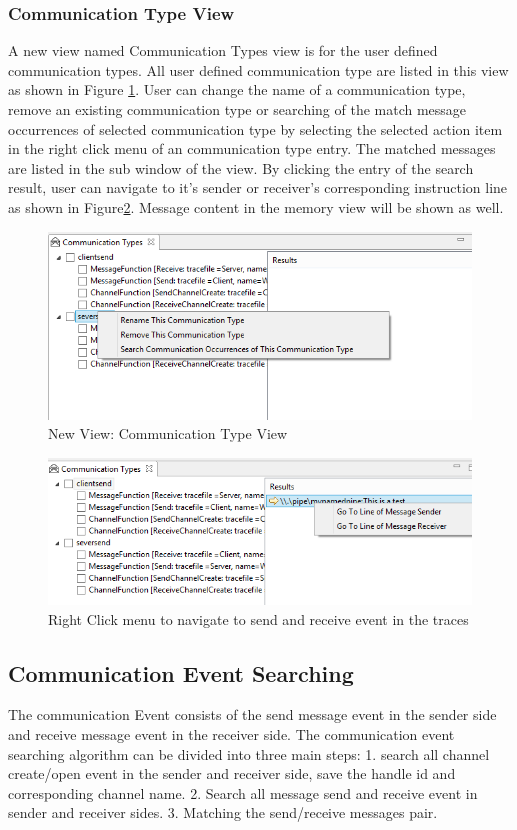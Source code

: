 \documentclass[paper=a4, fontsize=11pt]{scrartcl}
\numberwithin{equation}{section}		%
\numberwithin{figure}{section}			%
\numberwithin{table}{section}				%
\begin{document}
\subsubsection{Communication Type View}
A new view named Communication Types view is for the user defined communication types. All user defined communication type are listed in this view  as shown in Figure \ref{CommunicationTypeview}. User can change the name of a communication type, remove an existing communication type or searching of the match message occurrences of selected communication type by selecting the selected action item in the right click menu of an communication type entry. The matched messages are listed in the sub window of the view. By clicking the entry of the search  result, user can navigate to it's sender or receiver's corresponding instruction line as shown in Figure\ref{searchresult}. Message content in the memory view will be shown as well.


\begin{figure}[h]
\includegraphics{CommunicationTypeview}
 \caption{New View: Communication Type View}
\label{CommunicationTypeview}
\end{figure}

\begin{figure}[h]
\includegraphics{searchresult}
 \caption{Right Click menu to navigate to send and receive event in the traces}
\label{searchresult}
\end{figure}

\subsection{Communication Event Searching}
The communication Event consists of the send message event in the sender side and receive message event in the receiver side. The communication event searching algorithm can be divided into three main steps: 1. search all channel create/open event in the sender and receiver side, save the handle id and corresponding channel name. 2. Search all message send and receive event in sender and receiver sides. 3. Matching the send/receive messages pair.
\end{document}
